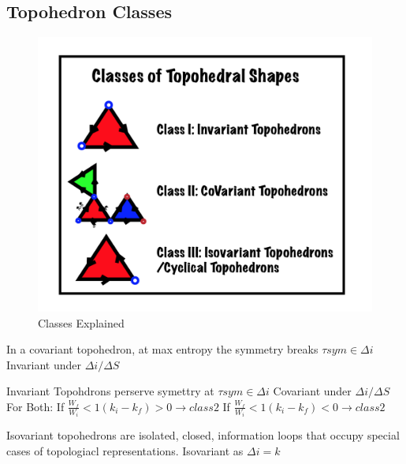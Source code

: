 \subsection{Topohedron Classes}


\begin{figure}[H]
  \includegraphics[width=\linewidth]{images/classes}
  \caption{Classes Explained} %
  \label{classes} 
\end{figure}

\begin{definition}
In a covariant topohedron, at max entropy the symmetry breaks $\tau sym \in \Delta i$  \newline
Invariant under $\Delta i / \Delta S$
\end{definition}
\begin{definition}
Invariant Topohdrons perserve symettry at $\tau sym \in \Delta i$ \newline
Covariant under $\Delta i / \Delta S$ \newline
For Both: \newline
If $\frac{W_f}{W_i} < 1 (k_i - k_f) > 0 \rightarrow class2$ \newline
If $\frac{W_f}{W_i} < 1 (k_i - k_f) < 0 \rightarrow class2$ \newline
\end{definition}


\begin{definition}
Isovariant topohedrons are isolated, closed, information loops that occupy special cases of topologiacl representations.\newline
Isovariant as $\Delta i = k$
\end{definition}

